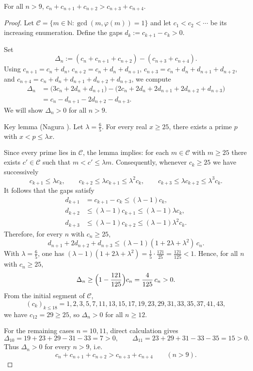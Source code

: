 \begin{theorem}\label{thm:sum_3_versus_sum_2_cyclics}
For all $n>9$, $c_n+c_{n+1}+c_{n+2}>c_{n+3}+c_{n+4}$.
\end{theorem}

\begin{proof}
Let $\mathcal C=\{m\in\mathbb N: \gcd(m,\varphi(m))=1\}$ and let $c_1<c_2<\cdots$ be its increasing enumeration. Define the gaps $d_k:=c_{k+1}-c_k>0$.

Set
$$
\Delta_n:=(c_n+c_{n+1}+c_{n+2})-(c_{n+3}+c_{n+4}).
$$
Using $c_{n+1}=c_n+d_n$, $c_{n+2}=c_n+d_n+d_{n+1}$, $c_{n+3}=c_n+d_n+d_{n+1}+d_{n+2}$, and $c_{n+4}=c_n+d_n+d_{n+1}+d_{n+2}+d_{n+3}$, we compute
\[
\begin{aligned}
\Delta_n&=\bigl(3c_n+2d_n+d_{n+1}\bigr)-\bigl(2c_n+2d_n+2d_{n+1}+2d_{n+2}+d_{n+3}\bigr)\\
&=c_n-d_{n+1}-2d_{n+2}-d_{n+3}.
\end{aligned}
\]
We will show $\Delta_n>0$ for all $n>9$.

Key lemma (Nagura \cite{Nagura1952}). Let $\lambda=\tfrac65$. For every real $x\ge25$, there exists a prime $p$ with $x<p\le\lambda x$.

Since every prime lies in $\mathcal C$, the lemma implies: for each $m\in\mathcal C$ with $m\ge25$ there exists $c'\in\mathcal C$ such that $m<c'\le\lambda m$. Consequently, whenever $c_k\ge25$ we have successively
$$
 c_{k+1}\le\lambda c_k,\qquad c_{k+2}\le\lambda c_{k+1}\le\lambda^2 c_k,\qquad c_{k+3}\le\lambda c_{k+2}\le\lambda^3 c_k.
$$
It follows that the gaps satisfy
\[
\begin{aligned}
 d_{k+1} &= c_{k+1}-c_k \le (\lambda-1)c_k,\\
 d_{k+2} &\le (\lambda-1)c_{k+1} \le (\lambda-1)\lambda c_k,\\
 d_{k+3} &\le (\lambda-1)c_{k+2} \le (\lambda-1)\lambda^2 c_k.
\end{aligned}
\]
Therefore, for every $n$ with $c_n\ge25$,
$$
 d_{n+1}+2d_{n+2}+d_{n+3}\le(\lambda-1)(1+2\lambda+\lambda^2)\,c_n.
$$
With $\lambda=\tfrac65$, one has $(\lambda-1)(1+2\lambda+\lambda^2)=\tfrac{1}{5}\cdot\tfrac{121}{25}=\tfrac{121}{125}<1$. Hence, for all $n$ with $c_n\ge25$,
$$
\Delta_n\ge\Bigl(1-\frac{121}{125}\Bigr)c_n=\frac{4}{125}\,c_n>0.
$$
From the initial segment of $\mathcal C$,
$$
(c_k)_{k\le 18}=1,2,3,5,7,11,13,15,17,19,23,29,31,33,35,37,41,43,
$$
we have $c_{12}=29\ge25$, so $\Delta_n>0$ for all $n\ge12$.

For the remaining cases $n=10,11$, direct calculation gives
$$
\Delta_{10}=19+23+29-31-33=7>0,\qquad \Delta_{11}=23+29+31-33-35=15>0.
$$
Thus $\Delta_n>0$ for every $n>9$, i.e.
$$
 c_n+c_{n+1}+c_{n+2}>c_{n+3}+c_{n+4}\qquad(n>9).
$$

\end{proof}


